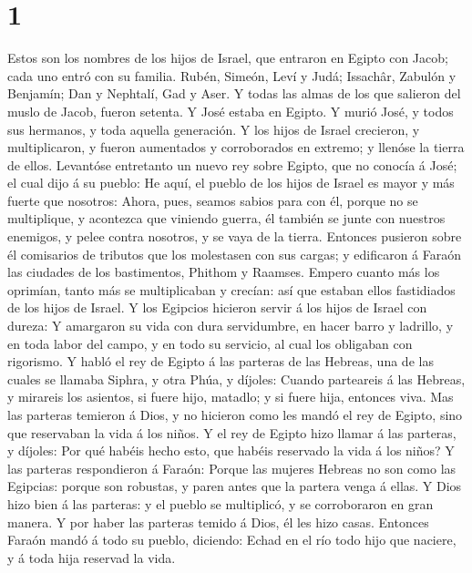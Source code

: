 \hypertarget{section}{%
\section{1}\label{section}}

 Estos son los nombres de los hijos de Israel, que entraron
en Egipto con Jacob; cada uno entró con su familia.  Rubén,
Simeón, Leví y Judá;  Issachâr, Zabulón y Benjamín;
 Dan y Nephtalí, Gad y Aser.  Y todas las almas
de los que salieron del muslo de Jacob, fueron setenta. Y José estaba en
Egipto.  Y murió José, y todos sus hermanos, y toda aquella
generación.  Y los hijos de Israel crecieron, y
multiplicaron, y fueron aumentados y corroborados en extremo; y llenóse
la tierra de ellos.  Levantóse entretanto un nuevo rey sobre
Egipto, que no conocía á José; el cual dijo á su pueblo:  He
aquí, el pueblo de los hijos de Israel es mayor y más fuerte que
nosotros:  Ahora, pues, seamos sabios para con él, porque
no se multiplique, y acontezca que viniendo guerra, él también se junte
con nuestros enemigos, y pelee contra nosotros, y se vaya de la tierra.
 Entonces pusieron sobre él comisarios de tributos que los
molestasen con sus cargas; y edificaron á Faraón las ciudades de los
bastimentos, Phithom y Raamses.  Empero cuanto más los
oprimían, tanto más se multiplicaban y crecían: así que estaban ellos
fastidiados de los hijos de Israel.  Y los Egipcios
hicieron servir á los hijos de Israel con dureza:  Y
amargaron su vida con dura servidumbre, en hacer barro y ladrillo, y en
toda labor del campo, y en todo su servicio, al cual los obligaban con
rigorismo.  Y habló el rey de Egipto á las parteras de las
Hebreas, una de las cuales se llamaba Siphra, y otra Phúa, y díjoles:
 Cuando parteareis á las Hebreas, y mirareis los asientos,
si fuere hijo, matadlo; y si fuere hija, entonces viva. 
Mas las parteras temieron á Dios, y no hicieron como les mandó el rey de
Egipto, sino que reservaban la vida á los niños.  Y el rey
de Egipto hizo llamar á las parteras, y díjoles: Por qué habéis hecho
esto, que habéis reservado la vida á los niños?  Y las
parteras respondieron á Faraón: Porque las mujeres Hebreas no son como
las Egipcias: porque son robustas, y paren antes que la partera venga á
ellas.  Y Dios hizo bien á las parteras: y el pueblo se
multiplicó, y se corroboraron en gran manera.  Y por haber
las parteras temido á Dios, él les hizo casas.  Entonces
Faraón mandó á todo su pueblo, diciendo: Echad en el río todo hijo que
naciere, y á toda hija reservad la vida.

